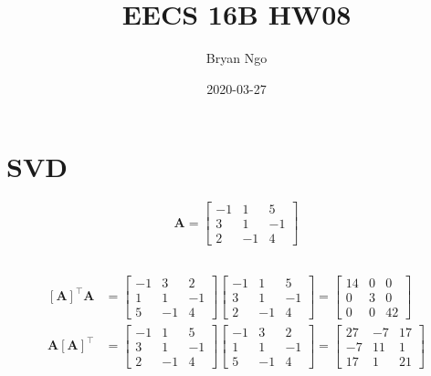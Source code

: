\documentclass[]{article}
\title{EECS 16B HW08}
\author{Bryan Ngo}
\date{2020-03-27}
\newcommand{\tpose}[1]{\left[#1\right]^{\! \top} \!\!}
\begin{document}
\maketitle

\section{SVD}

\begin{equation}
	\bm{A} = \begin{bmatrix}
	-1 & 1 & 5 \\
	3 & 1 & -1 \\
	2 & -1 & 4
	\end{bmatrix}
\end{equation}

\subsection{}

\begin{align}
	\tpose{\bm{A}} \bm{A} &= \begin{bmatrix}
	-1 & 3 & 2 \\
	1 & 1 & -1 \\
	5 & -1 & 4
	\end{bmatrix}
	\begin{bmatrix}
	-1 & 1 & 5 \\
	3 & 1 & -1 \\
	2 & -1 & 4
	\end{bmatrix}
	=
	\begin{bmatrix}
	14 & 0 & 0 \\
	0 & 3 & 0 \\
	0 & 0 & 42
	\end{bmatrix} \\
	\bm{A} \tpose{\bm{A}} &= \begin{bmatrix}
	-1 & 1 & 5 \\
	3 & 1 & -1 \\
	2 & -1 & 4
	\end{bmatrix}
	\begin{bmatrix}
	-1 & 3 & 2 \\
	1 & 1 & -1 \\
	5 & -1 & 4
	\end{bmatrix}
	=
	\begin{bmatrix}
	27 & -7 & 17 \\
	-7 & 11 & 1 \\
	17 & 1 & 21
	\end{bmatrix}
\end{align}
\end{document}
